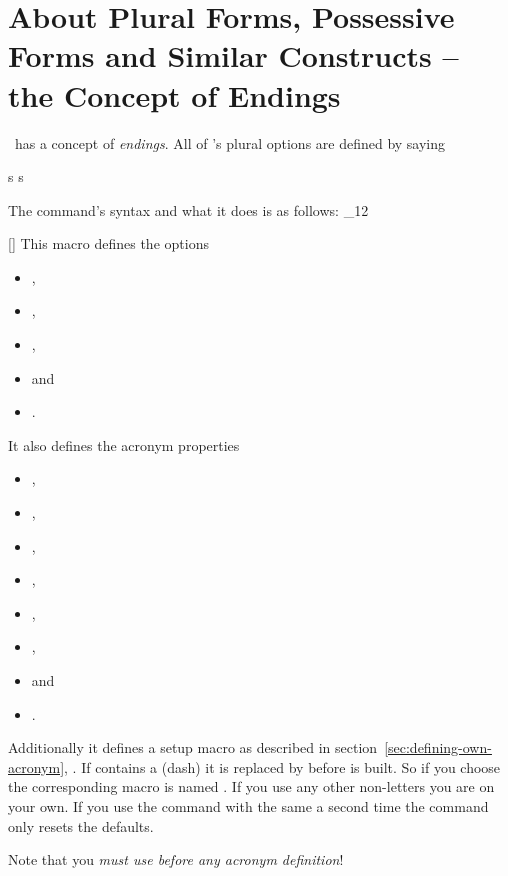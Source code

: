 \documentclass[load-preamble+]{cnltx-doc}
\makeatletter
\renewenvironment{commands}
  {%
    \cnltx@set@catcode_{12}%
    \let\command\cnltx@command
    \cnltxlist
  }
  {\endcnltxlist}
\makeatother
\begin{document}
\section{About Plural Forms, Possessive Forms and Similar Constructs -- the
  Concept of Endings}\label{sec:about-plural-forms}

\acro\ has a concept of \emph{endings}.  All of \acro's plural options are
defined by saying
\begin{sourcecode}
   {s} {s}
\end{sourcecode}
The command's syntax and what it does is as follows:
\begin{commands}
  \command{ProvideAcroEnding}[]
    This macro defines the options
    \begin{itemize}
      \item {},
      \item {},
      \item {},
      \item {} and
      \item {}.
    \end{itemize}
    It also defines the acronym properties
    \begin{itemize}
      \item {},
      \item {},
      \item {},
      \item {},
      \item {},
      \item {},
      \item {} and
      \item {}.
    \end{itemize}
    Additionally it defines a setup macro as
    described in section~\vref{sec:defining-own-acronym},
    .  If  contains a \code{-} (dash) it is
    replaced by \code{\_} before  is built.  So if you
    choose  the corresponding macro is named
    .  If you use any other non-letters you are on your
    own. If you use the command with the same 
    a second time the command only resets the defaults.

    Note that you \emph{must use  before any acronym
      definition}!
\end{commands}
\end{document}
